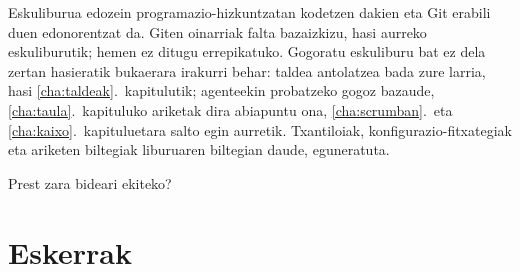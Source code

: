 Eskuliburua edozein programazio-hizkuntzatan kodetzen dakien eta Git erabili duen edonorentzat da.
Giten oinarriak falta bazaizkizu, hasi aurreko eskuliburutik; hemen ez ditugu errepikatuko.
Gogoratu eskuliburu bat ez dela zertan hasieratik bukaerara irakurri behar: taldea antolatzea bada zure larria, hasi \ref{cha:taldeak}.~kapitulutik; agenteekin probatzeko gogoz bazaude, \ref{cha:taula}.~kapituluko ariketak dira abiapuntu ona, \ref{cha:scrumban}.~eta \ref{cha:kaixo}.~kapituluetara salto egin aurretik.
Txantiloiak, konfigurazio-fitxategiak eta ariketen biltegiak liburuaren biltegian daude, eguneratuta.

Prest zara bideari ekiteko?

\section{Eskerrak}

